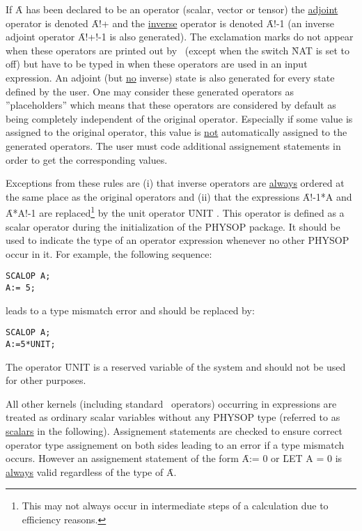 If \f{A} has been declared to be an operator (scalar, vector or tensor)
the \underline{adjoint} operator is denoted \f{A!+} and the
\underline{inverse}
operator is denoted \f{A!-1} (an inverse adjoint operator \f{A!+!-1}
is also generated).
The exclamation marks do not appear
when these operators are printed out by \REDUCE\ (except when the switch
\f{NAT} is set to off)
but have to be typed in when these operators are used in an input
expression.
An adjoint (but \underline{no} inverse)  state  is also
generated  for every state defined by the user.
One may consider these generated operators as ''placeholders'' which
means that these operators are considered by default as
being completely independent of the original operator.
Especially if some value is assigned to the original operator,
this value is \underline{not} automatically assigned to the
generated operators. The user must code additional assignement
statements in order to get the corresponding values.

Exceptions from these rules are (i) that inverse operators are
\underline{always} ordered at the same place as the original operators
and (ii) that  the expressions \f{A!-1*A}
and \f{A*A!-1} are replaced\footnote{This may not always occur in
intermediate steps of a calculation  due to efficiency reasons.}
by the unit operator \f{UNIT} .
This operator is defined
as a scalar operator during the initialization of the PHYSOP package.
It should be used to indicate
the type of an operator expression whenever no other PHYSOP
occur in it. For example, the following sequence: 

\begin{verbatim}
SCALOP A;
A:= 5;
\end{verbatim}
leads to a type mismatch error and should be replaced by: 

\begin{verbatim}
SCALOP A;
A:=5*UNIT;
\end{verbatim}
The operator \f{UNIT} is a reserved variable of the system and should
not be used for other purposes.

All other kernels  (including standard \REDUCE\ operators)
occurring in expressions are treated as ordinary scalar variables
without any PHYSOP type (referred to as \underline{scalars} in the
following).
Assignement statements are checked to ensure correct operator
type assignement on both sides leading to an error if a type
mismatch occurs. However an assignement statement of the form
\f{A:= 0} or \f{LET A = 0} is \underline{always} valid regardless of the
type of \f{A}.

